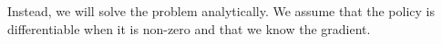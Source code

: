 \documentclass[a4paper]{article}
\begin{document}
Instead, we will solve the problem analytically. We assume that the policy is differentiable when it is non-zero and that we know the gradient. 


\end{document}

